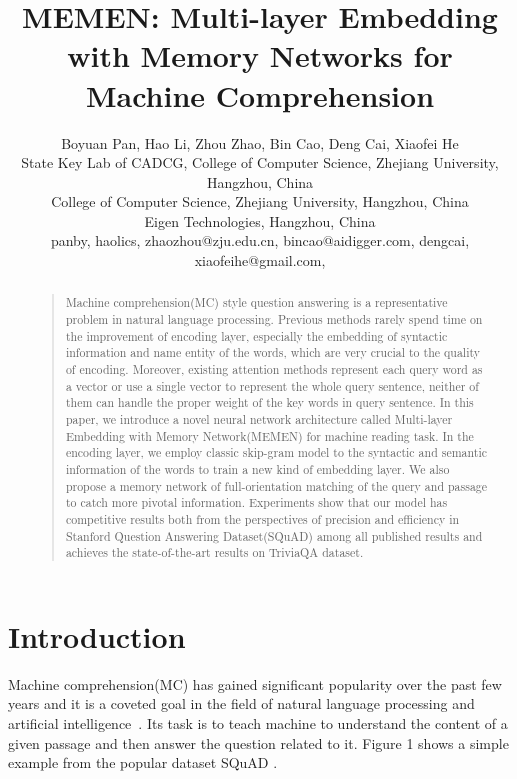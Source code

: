 \documentclass[letterpaper]{article}
\begin{document}
\title{MEMEN: Multi-layer Embedding with Memory Networks for Machine Comprehension}

\author{Boyuan Pan, Hao Li, Zhou Zhao, Bin Cao, Deng Cai, Xiaofei He\\
	State Key Lab of CADCG, College of Computer Science, Zhejiang University, Hangzhou, China\\
	College of Computer Science, Zhejiang University, Hangzhou, China\\
	Eigen Technologies, Hangzhou, China\\
	panby, haolics, zhaozhou@zju.edu.cn, bincao@aidigger.com, dengcai, xiaofeihe@gmail.com,  \\
}

\maketitle

\begin{abstract}
\begin{quote}
Machine comprehension(MC) style question answering is a representative problem in natural language processing. Previous methods rarely spend time on the improvement of encoding layer, especially the embedding of syntactic information and name entity of the words, which are very crucial to the quality of encoding. Moreover, existing attention methods represent each query word as a vector or use a single vector to represent the whole query sentence, neither of them can handle the proper weight of the key words in query sentence. In this paper, we introduce a novel neural network architecture called Multi-layer Embedding with Memory Network(MEMEN) for machine reading task. In the encoding layer, we employ classic skip-gram model to the syntactic and semantic information of the words to train a new kind of embedding layer. We also propose a memory network of full-orientation matching of the query and passage to catch more pivotal information. Experiments show that our model has competitive results both from the perspectives of precision and efficiency in Stanford Question Answering Dataset(SQuAD) among all published results and achieves the state-of-the-art results on TriviaQA dataset.


\end{quote}
\end{abstract}


\section{Introduction}
Machine comprehension(MC) has gained significant popularity over the past few years and it is a coveted goal in the field of natural language processing and artificial intelligence~\citep{shen2016reasonet,seo2016bidirectional}. Its task is to teach machine to understand the content of a given passage and then answer the question related to it. Figure 1 shows a simple example from the popular dataset SQuAD \citep{rajpurkar2016squad}.
\end{document}
